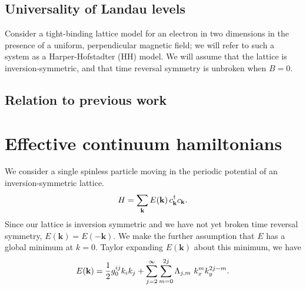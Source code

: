 \documentclass[aps,prb,twocolumn,letterpaper,twoside,nobalancelastpage,groupedaddress,amsmath,amssymb,floatfix,citeautoscript]{revtex4-1}
\begin{document}
\subsection{Universality of Landau levels}
Consider a tight-binding lattice model for an electron in two dimensions in the presence of a uniform, perpendicular magnetic field; we will refer to such a system as a Harper-Hofstadter (HH) model.
We will assume that the lattice is inversion-symmetric, and that time reversal symmetry is unbroken when $B=0$.

\subsection{Relation to previous work}







\section{Effective continuum hamiltonians}
We consider a single spinless particle moving in the periodic potential of an inversion-symmetric lattice. 
\begin{align*}
H = \sum_{{\bf k}}E({\bf k})\, c^{\dag}_{{\bf k}}c_{{\bf k}}.
\end{align*}
Since our lattice is inversion symmetric and we have not yet broken time reversal symmetry, $E(\mathbf{k}) = E(-\mathbf{k})$. We make the further assumption that $E$ has a global minimum at $k=0$. Taylor expanding $E(\mathbf{k})$ about this minimum, we have
\begin{align}
\label{equation:generic-dispersion}
E({\bf k}) = \frac{1}{2}g_0^{ij}k_i k_j
+ \sum_{j=2}^{\infty}\sum_{m=0}^{2j} \Lambda_{j,m}~ k_x^m k_y^{2j-m}.
\end{align}
\end{document}
